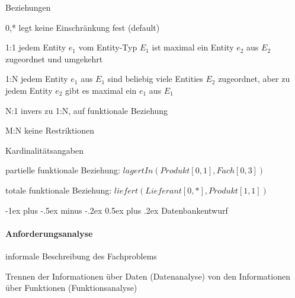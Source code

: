 \documentclass[a4paper]{article}
\makeatletter
\renewcommand{\section}{\@startsection{section}{1}{0mm}%
                                {-1ex plus -.5ex minus -.2ex}%
                                {0.5ex plus .2ex}%
                                {\normalfont\large\bfseries}}
\makeatother
\begin{document}
\begin{multicols}{3}
    Beziehungen
    \begin{description*}
        \item[0,*] legt keine Einschränkung fest (default)
        \item[1:1] jedem Entity $e_1$ vom Entity-Typ $E_1$ ist maximal ein Entity $e_2$ aus $E_2$ zugeordnet und umgekehrt
        \item[1:N] jedem Entity $e_1$ aus $E_1$ sind beliebig viele Entities $E_2$ zugeordnet, aber zu jedem Entity $e_2$ gibt es maximal ein $e_1$ aus $E_1$
        \item[N:1] invers zu 1:N, auf funktionale Beziehung
        \item[M:N] keine Restriktionen
        \item[Kardinalitätsangaben]
    \begin{itemize*}
            \item partielle funktionale Beziehung: $lagertIn(Produkt[0,1],Fach[0,3])$
            \item totale funktionale Beziehung: $liefert(Lieferant[0,*],Produkt[1,1])$
    \end{itemize*}
    \end{description*}

    \section{Datenbankentwurf}
    \paragraph{Anforderungsanalyse}
    \begin{itemize*}
            \item informale Beschreibung des Fachproblems
            \item Trennen der Informationen über Daten (Datenanalyse) von den Informationen über Funktionen (Funktionsanalyse)
        \end{itemize*}


\end{multicols}
\end{document}
